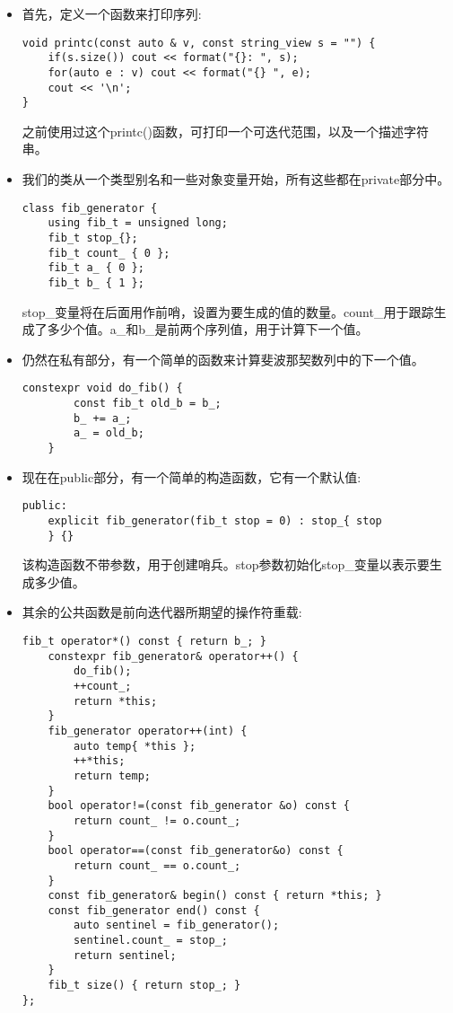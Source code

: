 \begin{itemize}
\item 
首先，定义一个函数来打印序列:

\begin{lstlisting}[style=styleCXX]
void printc(const auto & v, const string_view s = "") {
	if(s.size()) cout << format("{}: ", s);
	for(auto e : v) cout << format("{} ", e);
	cout << '\n';
}
\end{lstlisting}

之前使用过这个printc()函数，可打印一个可迭代范围，以及一个描述字符串。

\item 
我们的类从一个类型别名和一些对象变量开始，所有这些都在private部分中。

\begin{lstlisting}[style=styleCXX]
class fib_generator {
	using fib_t = unsigned long;
	fib_t stop_{};
	fib_t count_ { 0 };
	fib_t a_ { 0 };
	fib_t b_ { 1 };
\end{lstlisting}

stop\_变量将在后面用作前哨，设置为要生成的值的数量。count\_用于跟踪生成了多少个值。a\_和b\_是前两个序列值，用于计算下一个值。

\item 
仍然在私有部分，有一个简单的函数来计算斐波那契数列中的下一个值。

\begin{lstlisting}[style=styleCXX]
	constexpr void do_fib() {
		const fib_t old_b = b_;
		b_ += a_;
		a_ = old_b;
	}
\end{lstlisting}

\item 
现在在public部分，有一个简单的构造函数，它有一个默认值:

\begin{lstlisting}[style=styleCXX]
public:
	explicit fib_generator(fib_t stop = 0) : stop_{ stop
	} {}
\end{lstlisting}

该构造函数不带参数，用于创建哨兵。stop参数初始化stop\_变量以表示要生成多少值。

\item 
其余的公共函数是前向迭代器所期望的操作符重载:

\begin{lstlisting}[style=styleCXX]
	fib_t operator*() const { return b_; }
	constexpr fib_generator& operator++() {
		do_fib();
		++count_;
		return *this;
	}
	fib_generator operator++(int) {
		auto temp{ *this };
		++*this;
		return temp;
	}
	bool operator!=(const fib_generator &o) const {
		return count_ != o.count_;
	}
	bool operator==(const fib_generator&o) const {
		return count_ == o.count_;
	}
	const fib_generator& begin() const { return *this; }
	const fib_generator end() const {
		auto sentinel = fib_generator();
		sentinel.count_ = stop_;
		return sentinel;
	}
	fib_t size() { return stop_; }
};
\end{lstlisting}


\end{itemize}

